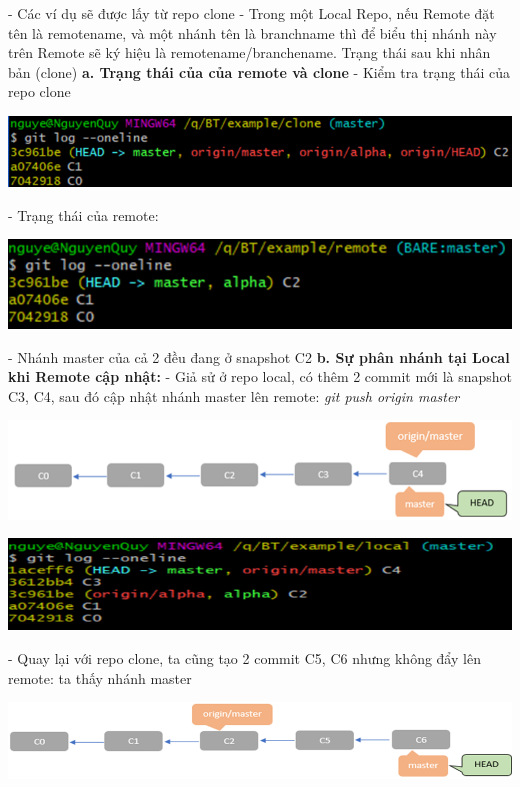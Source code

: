 \documentclass[12pt,a4paper]{report}
\begin{document}
 - Các ví dụ sẽ được lấy từ repo clone\vskip 0.4cm
 - Trong một Local Repo, nếu Remote đặt tên là remotename, và một nhánh tên là branchname thì để biểu thị nhánh này trên Remote sẽ ký hiệu là remotename/branchename. Trạng thái sau khi nhân bản (clone)\vskip 0.4cm
 {\bf a. Trạng thái của của remote và clone}\vskip 0.4cm
 - Kiểm tra trạng thái của repo clone\vskip 0.4cm

 	\includegraphics[width=0.8\linewidth]{screenshot067}
 
 	\label{fig:screenshot067}
\vskip 0.4cm\vskip 0.4cm
 - Trạng thái của remote:\vskip 0.4cm

 	\includegraphics[width=0.8\linewidth]{screenshot068}

 	\label{fig:screenshot068}
\vskip 0.4cm\vskip 0.4cm
 - Nhánh master của cả 2 đều đang ở snapshot C2\vskip 0.4cm
{\bf b. Sự phân nhánh tại Local khi Remote cập nhật:}\vskip 0.4cm
 - Giả sử ở repo local, có thêm 2 commit mới là snapshot C3, C4, sau đó cập nhật nhánh master lên remote: {\it git push origin master}\vskip 0.4cm


 	\includegraphics[width=0.8\linewidth]{screenshot069}

 	\label{fig:screenshot069}
\vskip 0.4cm\vskip 0.4cm
 	\includegraphics[width=0.8\linewidth]{screenshot070}
 
 	\label{fig:screenshot070}\vskip 0.4cm\vskip 0.4cm

 - Quay lại với repo clone, ta cũng tạo 2 commit C5, C6 nhưng không đẩy lên remote: ta thấy nhánh master \vskip 0.4cm
 
 	\includegraphics[width=0.8\linewidth]{screenshot071}
 
\end{document}
